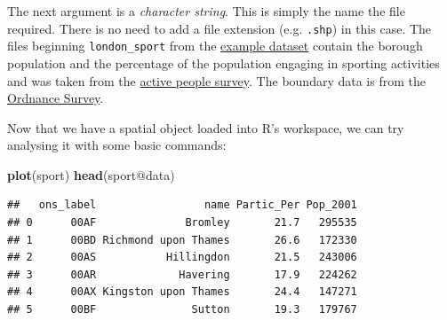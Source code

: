 \documentclass[]{article}
\newenvironment{Shaded}{}{}
\newcommand{\KeywordTok}[1]{\textcolor[rgb]{0.00,0.44,0.13}{\textbf{{#1}}}}
\newcommand{\DataTypeTok}[1]{\textcolor[rgb]{0.56,0.13,0.00}{{#1}}}
\newcommand{\DecValTok}[1]{\textcolor[rgb]{0.25,0.63,0.44}{{#1}}}
\newcommand{\StringTok}[1]{\textcolor[rgb]{0.25,0.44,0.63}{{#1}}}
\newcommand{\OtherTok}[1]{\textcolor[rgb]{0.00,0.44,0.13}{{#1}}}
\newcommand{\NormalTok}[1]{{#1}}
\begin{document}
The next argument is a \emph{character string}. This is simply the name
the file required. There is no need to add a file extension (e.g.
\texttt{.shp}) in this case. The files beginning \texttt{london\_sport}
from the
\href{http://spatial.ly/wp-content/uploads/2013/12/spatialggplot.zip}{example
dataset} contain the borough population and the percentage of the
population engaging in sporting activities and was taken from the
\href{http://data.london.gov.uk/datastore/package/active-people-survey-kpi-data-borough}{active
people survey}. The boundary data is from the
\href{http://www.ordnancesurvey.co.uk/oswebsite/opendata/}{Ordnance
Survey}.

Now that we have a spatial object loaded into R's workspace, we can try
analysing it with some basic commands:

\begin{Shaded}
\begin{Highlighting}[]
\KeywordTok{plot}\NormalTok{(sport)}
\KeywordTok{head}\NormalTok{(sport@data)}
\end{Highlighting}
\end{Shaded}
\begin{verbatim}
##   ons_label                 name Partic_Per Pop_2001
## 0      00AF              Bromley       21.7   295535
## 1      00BD Richmond upon Thames       26.6   172330
## 2      00AS           Hillingdon       21.5   243006
## 3      00AR             Havering       17.9   224262
## 4      00AX Kingston upon Thames       24.4   147271
## 5      00BF               Sutton       19.3   179767
\end{verbatim}
\begin{Shaded}
\end{Shaded}
\end{document}
